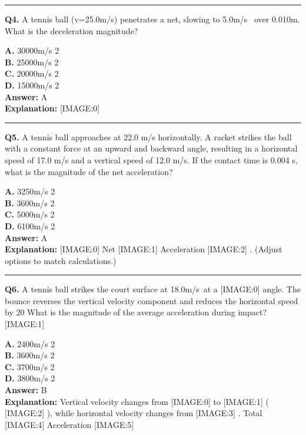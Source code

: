 \documentclass[12pt]{article}
\begin{document}
\hrule
\vspace{1em}


\noindent
\textbf{Q4.} A tennis ball (v=25.0m/s) penetrates a net, slowing to 5.0m/s  over 0.010m.
What is the deceleration magnitude?



\textbf{A.} 30000m/s
2 \\
\textbf{B.} 25000m/s
2 \\
\textbf{C.} 20000m/s
2 \\
\textbf{D.} 15000m/s
2 \\

\textbf{Answer:} A \\
\textbf{Explanation:} [IMAGE:0]

\hrule
\vspace{1em}


\noindent
\textbf{Q5.} A tennis ball approaches at 22.0 m/s horizontally.
A racket strikes the ball with a constant force at an upward and backward angle, resulting in a horizontal speed of 17.0 m/s and a vertical speed of 12.0 m/s.
If the contact time is 0.004 s, what is the magnitude of the net acceleration?



\textbf{A.} 3250m/s
2 \\
\textbf{B.} 3600m/s
2 \\
\textbf{C.} 5000m/s
2 \\
\textbf{D.} 6100m/s
2 \\

\textbf{Answer:} A \\
\textbf{Explanation:} [IMAGE:0]
Net
[IMAGE:1]
Acceleration
[IMAGE:2]
.
(Adjust options to match calculations.)

\hrule
\vspace{1em}


\noindent
\textbf{Q6.} A tennis ball strikes the court surface at 18.0m/s at a
[IMAGE:0]
angle. The bounce reverses the vertical velocity component and reduces the horizontal speed by 20%
What is the magnitude of the average acceleration during impact?
[IMAGE:1]



\textbf{A.} 2400m/s
2 \\
\textbf{B.} 3600m/s
2 \\
\textbf{C.} 3700m/s
2 \\
\textbf{D.} 3800m/s
2 \\

\textbf{Answer:} B \\
\textbf{Explanation:} Vertical velocity changes from
[IMAGE:0]
to
[IMAGE:1]
(
[IMAGE:2]
), while horizontal velocity changes from
[IMAGE:3]
. Total
[IMAGE:4]
Acceleration
[IMAGE:5]
\end{document}

